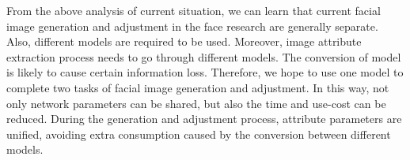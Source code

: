 \vspace{3ex}

From the above analysis of current situation,
    we can learn that current facial image generation and adjustment in the face research are generally separate.
Also, different models are required to be used.
Moreover, image attribute extraction process needs to go through different models.
The conversion of model is likely to cause certain information loss.
Therefore, we hope to use one model to complete two tasks of facial image generation and adjustment.
In this way, not only network parameters can be shared,
    but also the time and use-cost can be reduced.
During the generation and adjustment process, attribute parameters are unified,
    avoiding extra consumption caused by the conversion between different models.